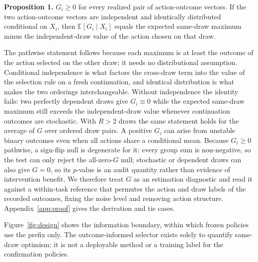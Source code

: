 \textbf{Proposition 1.} $G_i\geq0$ for every realized pair of action-outcome vectors. If the two action-outcome vectors are independent and identically distributed conditional on $X_i$, then $\mathbb{E}[G_i\mid X_i]$ equals the expected same-draw maximum minus the independent-draw value of the action chosen on that draw.

The pathwise statement follows because each maximum is at least the outcome of the action selected on the other draw; it needs no distributional assumption. Conditional independence is what factors the cross-draw term into the value of the selection rule on a fresh continuation, and identical distribution is what makes the two orderings interchangeable. Without independence the identity fails: two perfectly dependent draws give $G_i\equiv0$ while the expected same-draw maximum still exceeds the independent-draw value whenever continuation outcomes are stochastic. With $R>2$ draws the same statement holds for the average of $G$ over ordered draw pairs. A positive $G_i$ can arise from unstable binary outcomes even when all actions share a conditional mean. Because $G_i\geq0$ pathwise, a sign-flip null is degenerate for it: every group sum is non-negative, so the test can only reject the all-zero-$G$ null; stochastic or dependent draws can also give $G=0$, so its $p$-value is an audit quantity rather than evidence of intervention benefit. We therefore treat $G$ as an estimation diagnostic and read it against a within-task reference that permutes the action and draw labels of the recorded outcomes, fixing the noise level and removing action structure. Appendix~\ref{app:proof} gives the derivation and tie cases.

Figure~\ref{fig:design} shows the information boundary, within which frozen policies use the prefix only. The outcome-informed selector exists solely to quantify same-draw optimism; it is not a deployable method or a training label for the confirmation policies.

